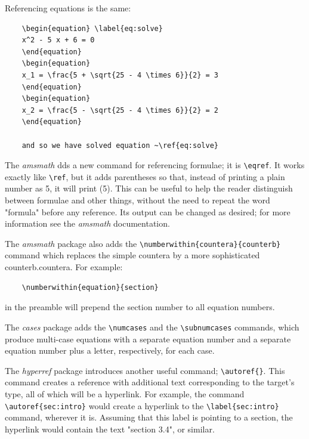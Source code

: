 \documentclass[10pt, a4paper]{article}
\begin{document}
Referencing equations is the same:
\begin{verbatim}
	\begin{equation} \label{eq:solve}
	x^2 - 5 x + 6 = 0
	\end{equation}
	\begin{equation}
	x_1 = \frac{5 + \sqrt{25 - 4 \times 6}}{2} = 3
	\end{equation}
	\begin{equation}
	x_2 = \frac{5 - \sqrt{25 - 4 \times 6}}{2} = 2
	\end{equation}
	
	and so we have solved equation ~\ref{eq:solve}
\end{verbatim}

The \textsl{amsmath} dds a new command for referencing formulae; it is \texttt{\textbackslash eqref}. It works exactly like \texttt{\textbackslash ref}, but it adds parentheses so that, instead of printing a plain number as 5, it will print (5). This can be useful to help the reader distinguish between formulae and other things, without the need to repeat the word "formula" before any reference. Its output can be changed as desired; for more information see the \textsl{amsmath} documentation.

The \textsl{amsmath} package also adds the \texttt{\textbackslash numberwithin\{countera\}\{counterb\}} command which replaces the simple countera by a more sophisticated counterb.countera. For example:
\begin{verbatim}
	\numberwithin{equation}{section} 
\end{verbatim} 
in the preamble will prepend the section number to all equation numbers.

The \textsl{cases} package adds the \texttt{\textbackslash numcases} and the \texttt{\textbackslash subnumcases} commands, which produce multi-case equations with a separate equation number and a separate equation number plus a letter, respectively, for each case.

The \textsl{hyperref} package introduces another useful command; \texttt{\textbackslash autoref\{\}}. This command creates a reference with additional text corresponding to the target's type, all of which will be a hyperlink. For example, the command \texttt{\textbackslash autoref\{sec:intro\}} would create a hyperlink to the \texttt{\textbackslash label\{sec:intro\}} command, wherever it is. Assuming that this label is pointing to a section, the hyperlink would contain the text "section 3.4", or similar.
\end{document}
